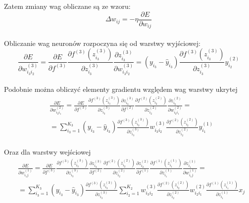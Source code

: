 \documentclass[12pt,twoside]{article}
\begin{document}
Zatem zmiany wag obliczane są ze wzoru:\\
\begin{equation}
\Delta w_{ij} = - \eta \frac{\partial E}{\partial w_{ij}}
\end{equation}\\

Obliczanie wag neuronów rozpoczyna się od warstwy wyjściowej:\\
\begin{equation}
\frac{\partial E}{\partial w_{i_{3}i_{2}}^{(3)}} = \frac{\partial E}{\partial f^{(3)}} \frac{\partial f^{(3)}\left( z_{i_{3}}^{(3)} \right)}{\partial z_{i_{3}}^{(3)}} \frac{\partial z_{i_{3}}^{(3)}}{\partial w_{i_{3}i_{2}}^{(3)}} = \left( y_{i_{3}} - \hat{y}_{i_{3}} \right) \frac{\partial f^{(3)}\left( z_{i_{3}}^{(3)} \right)}{\partial z_{i_{3}}^{(3)}} y_{i_{2}}^{(2)}
\end{equation}\\
\newpage
Podobnie można obliczyć elementy gradientu względem wag warstwy ukrytej\\
\begin{equation}
\begin{aligned}
&\frac{\partial E}{\partial w_{i_{2}i_{1}}^{(2)}} = \frac{\partial E}{\partial f^{(3)}} \frac{\partial f^{(3)}\left( z_{i_{3}}^{(3)} \right)}{\partial z_{i_{3}}^{(3)}} \frac{\partial z_{i_{3}}^{(3)}}{\partial f^{(2)}} \frac{\partial f^{(2)}\left( z_{i_{2}}^{(2)} \right)}{\partial z_{i_{2}}^{(2)}} \frac{\partial z_{i_{2}}^{(2)}}{\partial w_{i_{2}i_{1}}^{(2)}}  =\\
&= \sum_{i_{3}=1}^{K_3}\left( y_{i_{3}} - \hat{y}_{i_{3}} \right) \frac{\partial f^{(3)}\left( z_{i_{3}}^{(3)} \right)}{\partial z_{i_{3}}^{(3)}} w_{i_{3}i_{2}}^{(3)} \frac{\partial f^{(2)}\left( z_{i_{2}}^{(2)} \right)}{\partial z_{i_{2}}^{(2)}} y_{i_{1}}^{(1)}
\end{aligned}
\end{equation}\\

Oraz dla warstwy wejściowej\\
\begin{equation}
\begin{aligned}
&\frac{\partial E}{\partial w_{i_{1}j}^{(1)}} = \frac{\partial E}{\partial f^{(3)}} \frac{\partial f^{(3)}\left( z_{i_{3}}^{(3)} \right)}{\partial z_{i_{3}}^{(3)}} \frac{\partial z_{i_{3}}^{(3)}}{\partial f^{(2)}} \frac{\partial f^{(2)}\left( z_{i_{2}}^{(2)} \right)}{\partial z_{i_{2}}^{(2)}} \frac{\partial z_{i_{2}}^{(2)}}{\partial f^{(1)}}  \frac{\partial f^{(1)}\left( z_{i_{1}}^{(1)} \right)}{\partial z_{i_{1}}^{(1)}} \frac{\partial z_{i_{1}}^{(1)}}{\partial w_{i_{1}j}^{(1)}}  =\\
&= \sum_{i_{3}=1}^{K_3}\left( y_{i_{3}} - \hat{y}_{i_{3}} \right) \frac{\partial f^{(3)}\left( z_{i_{3}}^{(3)} \right)}{\partial z_{i_{3}}^{(3)}} \sum_{i_{2}=1}^{K_2} w_{i_{3}i_{2}}^{(3)} \frac{\partial f^{(2)}\left( z_{i_{2}}^{(2)} \right)}{\partial z_{i_{2}}^{(2)}} w_{i_{2}i_{1}}^{(2)} \frac{\partial f^{(1)}\left( z_{i_{1}}^{(1)} \right)}{\partial z_{i_{1}}^{(1)}} x_j
\end{aligned}
\end{equation}
\\
\end{document}
